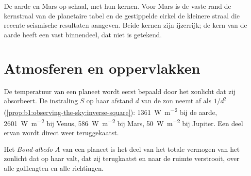 \begin{omfigure}

{\small De aarde en Mars op schaal, met hun kernen. Voor Mars is de vaste rand de kernstraal van de
planetaire tabel en de gestippelde cirkel de kleinere straal die recente seismische resultaten
aangeven. Beide kernen zijn ijzerrijk; de kern van de aarde heeft een vast binnendeel, dat niet is
getekend.}
\end{omfigure}

\section{Atmosferen en oppervlakken}

De temperatuur van een planeet wordt eerst bepaald door het zonlicht dat zij absorbeert. De
instraling $S$ op haar afstand $d$ van de zon neemt af als $1/d^2$
(\cref{prop:b1:observing-the-sky:inverse-square}): \qty{1361}{W.m^{-2}} bij de aarde,
\qty{2601}{W.m^{-2}} bij Venus, \qty{586}{W.m^{-2}} bij Mars, \qty{50}{W.m^{-2}} bij Jupiter.
Een deel ervan wordt direct weer teruggekaatst.

\begin{definition}\label{def:b1:comparative-planetology:albedo}
Het \emph{Bond-albedo} $A$ van een planeet is het deel van het totale vermogen van
het zonlicht dat op haar valt, dat zij terugkaatst en naar de ruimte verstrooit, over alle golflengten
en alle richtingen.
\end{definition}

